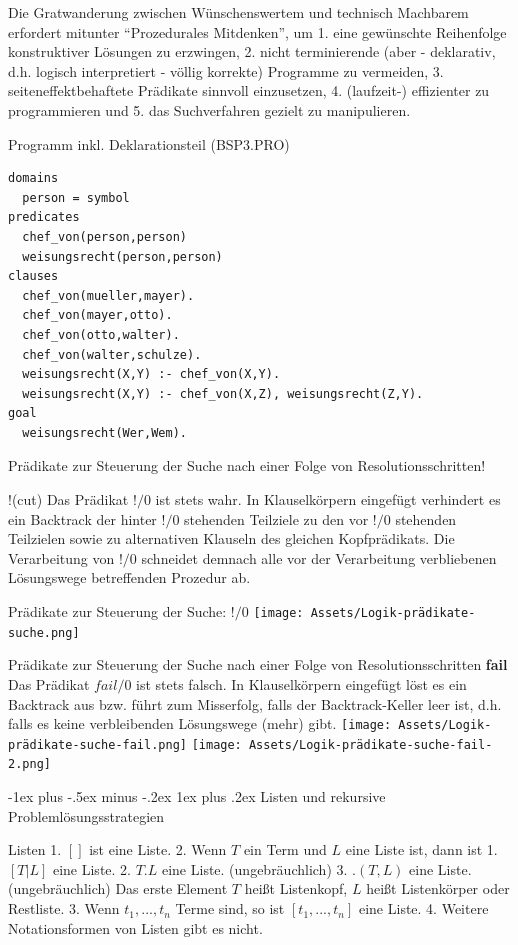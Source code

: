 \documentclass[a4paper]{article}
\makeatletter
\renewcommand{\subsubsection}{\@startsection{subsubsection}{3}{0mm}%
                {-1ex plus -.5ex minus -.2ex}%
                {1ex plus .2ex}%
                {\normalfont\small\bfseries}}
\makeatother
\begin{document}
\begin{multicols}{3}
  Die Gratwanderung zwischen Wünschenswertem und technisch Machbarem
  erfordert mitunter ``Prozedurales Mitdenken'', um 1. eine gewünschte
  Reihenfolge konstruktiver Lösungen zu erzwingen, 2. nicht terminierende
  (aber - deklarativ, d.h. logisch interpretiert - völlig korrekte)
  Programme zu vermeiden, 3. seiteneffektbehaftete Prädikate sinnvoll
  einzusetzen, 4. (laufzeit-) effizienter zu programmieren und 5. das
  Suchverfahren gezielt zu manipulieren.

  Programm inkl. Deklarationsteil (BSP3.PRO)

  \begin{verbatim}
domains
  person = symbol
predicates
  chef_von(person,person)
  weisungsrecht(person,person)
clauses
  chef_von(mueller,mayer).
  chef_von(mayer,otto).
  chef_von(otto,walter).
  chef_von(walter,schulze).
  weisungsrecht(X,Y) :- chef_von(X,Y).
  weisungsrecht(X,Y) :- chef_von(X,Z), weisungsrecht(Z,Y).
goal
  weisungsrecht(Wer,Wem).
\end{verbatim}

  Prädikate zur Steuerung der Suche nach einer Folge von
  Resolutionsschritten!

  !(cut) Das Prädikat $!/0$ ist stets wahr. In Klauselkörpern eingefügt
  verhindert es ein Backtrack der hinter $!/0$ stehenden Teilziele zu den
  vor $!/0$ stehenden Teilzielen sowie zu alternativen Klauseln des
  gleichen Kopfprädikats. Die Verarbeitung von $!/0$ schneidet demnach
  alle vor der Verarbeitung verbliebenen Lösungswege betreffenden Prozedur
  ab.

  Prädikate zur Steuerung der Suche: $!/0$
  \texttt{[image: Assets/Logik-prädikate-suche.png]}

  Prädikate zur Steuerung der Suche nach einer Folge von
  Resolutionsschritten \textbf{fail} Das Prädikat $fail/0$ ist stets
  falsch. In Klauselkörpern eingefügt löst es ein Backtrack aus bzw. führt
  zum Misserfolg, falls der Backtrack-Keller leer ist, d.h. falls es keine
  verbleibenden Lösungswege (mehr) gibt.
  \texttt{[image: Assets/Logik-prädikate-suche-fail.png]}
  \texttt{[image: Assets/Logik-prädikate-suche-fail-2.png]}

  \subsubsection{Listen und rekursive
    Problemlösungsstrategien}\label{listen-und-rekursive-problemluxf6sungsstrategien}

  Listen 1. $[]$ ist eine Liste. 2. Wenn $T$ ein Term und $L$ eine Liste
  ist, dann ist 1. $[T|L]$ eine Liste. 2. $T.L$ eine Liste.
  (ungebräuchlich) 3. $.(T,L)$ eine Liste. (ungebräuchlich) Das erste
  Element $T$ heißt Listenkopf, $L$ heißt Listenkörper oder Restliste. 3.
  Wenn $t_1, ... ,t_n$ Terme sind, so ist $[t_1,...,t_n]$ eine Liste. 4.
  Weitere Notationsformen von Listen gibt es nicht.


\end{multicols}
\end{document}
